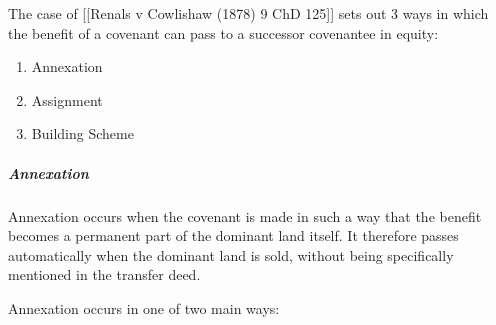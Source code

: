 \documentclass[
]{article}
\newenvironment{Shaded}{}{}
\newcommand{\NormalTok}[1]{#1}
\providecommand{\tightlist}{%
  \setlength{\itemsep}{0pt}\setlength{\parskip}{0pt}}
\begin{document}
The case of {[}{[}Renals v Cowlishaw (1878) 9 ChD 125{]}{]} sets out 3
ways in which the benefit of a covenant can pass to a successor
covenantee in equity:

\begin{enumerate}
\def\labelenumi{\arabic{enumi}.}
\tightlist
\item
  Annexation
\item
  Assignment
\item
  Building Scheme
\end{enumerate}

\hypertarget{annexation}{%
\subparagraph{Annexation}\label{annexation}}

\begin{Shaded}
\begin{Highlighting}[]
\NormalTok{Annexation occurs when the covenant is made in such a way that the benefit becomes a permanent part of the dominant land itself. It therefore passes automatically when the dominant land is sold, without being specifically mentioned in the transfer deed.}
\end{Highlighting}
\end{Shaded}

Annexation occurs in one of two main ways:
\end{document}
